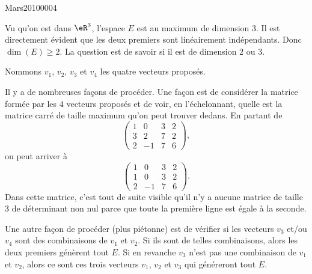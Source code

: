 

\begin{corrige}{Mars20100004}

	Vu qu'on est dans $\eR^3$, l'espace $E$ est au maximum de dimension $3$. Il est directement évident que les deux premiers sont linéairement indépendants. Donc $\dim(E)\geq 2$. La question est de savoir si il est de dimension $2$ ou $3$.

	Nommons $v_1$, $v_2$, $v_3$ et $v_4$ les quatre vecteurs proposés.

	Il y a de nombreuses façons de procéder. Une façon est de considérer la matrice formée par les $4$ vecteurs proposés et de voir, en l'échelonnant, quelle est la matrice carré de taille maximum qu'on peut trouver dedans. En partant de
	\begin{equation}
		\begin{pmatrix}
			 1	&	0	&	3	&	2	\\
			 3	&	2	&	7	&	2	\\ 
			 2	&	-1	&	7	&	6
		 \end{pmatrix},
	\end{equation}
	on peut arriver à
	\begin{equation}
		\begin{pmatrix}
			 1	&	0	&	3	&	2	\\
			 1	&	0	&	3	&	2	\\ 
			 2	&	-1	&	7	&	6
		 \end{pmatrix}.
	\end{equation}
	Dans cette matrice, c'est tout de suite visible qu'il n'y a aucune matrice de taille $3$ de déterminant non nul parce que toute la première ligne est égale à la seconde.

	Une autre façon de procéder (plus piétonne) est de vérifier si les vecteurs $v_3$ et/ou $v_4$ sont des combinaisons de $v_1$ et $v_2$. Si ils sont de telles combinaisons, alors les deux premiers génèrent tout $E$.  Si en revanche $v_3$ n'est pas une combinaison de $v_1$ et $v_2$, alors ce sont ces trois vecteurs $v_1$, $v_2$ et $v_3$ qui généreront tout $E$.


\end{corrige}
